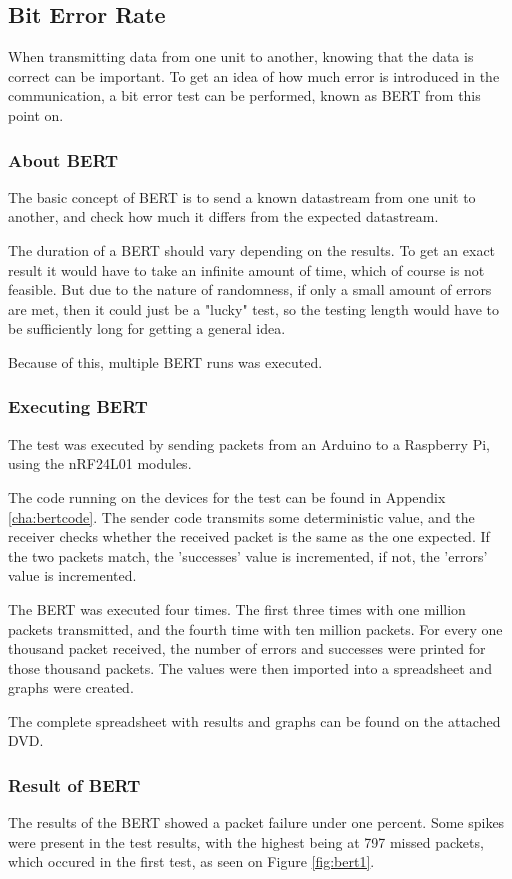 \subsection{Bit Error Rate}
When transmitting data from one unit to another, knowing that the data is correct can be important. To get an idea of how much error is introduced in the communication, a bit error test can be performed, known as BERT from this point on.

\subsubsection*{About BERT}

The basic concept of BERT is to send a known datastream from one unit to another, and check how much it differs from the expected datastream.

The duration of a BERT should vary depending on the results. To get an exact result it would have to take an infinite amount of time, which of course is not feasible. But due to the nature of randomness, if only a small amount of errors are met, then it could just be a "lucky" test, so the testing length would have to be sufficiently long for getting a general idea.

Because of this, multiple BERT runs was executed.

\subsubsection*{Executing BERT} 
The test was executed by sending packets from an Arduino to a Raspberry Pi, using the nRF24L01 modules.

The code running on the devices for the test can be found in Appendix \ref{cha:bertcode}.
The sender code transmits some deterministic value, and the receiver checks whether the received packet is the same as the one expected. If the two packets match, the 'successes' value is incremented, if not, the 'errors' value is incremented.

The BERT was executed four times. The first three times with one million packets transmitted, and the fourth time with ten million packets. For every one thousand packet received, the number of errors and successes were printed for those thousand packets. 
The values were then imported into a spreadsheet and graphs were created.

The complete spreadsheet with results and graphs can be found on the attached DVD. 

\subsubsection*{Result of BERT}
The results of the BERT showed a packet failure under one percent. Some spikes were present in the test results, with the highest being at 797 missed packets, which occured in the first test, as seen on Figure \ref{fig:bert1}.

